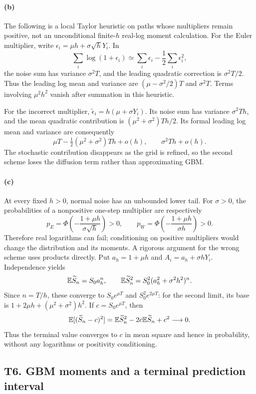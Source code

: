 \paragraph{(b)} The following is a local Taylor heuristic on paths whose multipliers remain positive, not an unconditional finite-$h$ real-log moment calculation. For the Euler multiplier, write $\epsilon_i=\mu h+\sigma\sqrt hY_i$. In
\[
 \sum_i\log(1+\epsilon_i)
 \simeq\sum_i\epsilon_i-\frac12\sum_i\epsilon_i^2,
\]
the noise sum has variance $\sigma^2T$, and the leading quadratic correction is $\sigma^2T/2$. Thus the leading log mean and variance are $(\mu-\sigma^2/2)T$ and $\sigma^2T$. Terms involving $\mu^2h^2$ vanish after summation in this heuristic.

For the incorrect multiplier, $\widetilde\epsilon_i=h(\mu+\sigma Y_i)$. Its noise sum has variance $\sigma^2Th$, and the mean quadratic contribution is $(\mu^2+\sigma^2)Th/2$. Its formal leading log mean and variance are consequently
\[
 \mu T-\tfrac12(\mu^2+\sigma^2)Th+o(h),\qquad
 \sigma^2Th+o(h).
\]
The stochastic contribution disappears as the grid is refined, so the second scheme loses the diffusion term rather than approximating GBM.
\paragraph{(c)} At every fixed $h>0$, normal noise has an unbounded lower tail. For $\sigma>0$, the probabilities of a nonpositive one-step multiplier are respectively
\[
 p_E=\Phi\!\left(-\frac{1+\mu h}{\sigma\sqrt h}\right)>0,
 \qquad
 p_W=\Phi\!\left(-\frac{1+\mu h}{\sigma h}\right)>0.
\]
Therefore real logarithms can fail; conditioning on positive multipliers would change the distribution and its moments. A rigorous argument for the wrong scheme uses products directly. Put $a_h=1+\mu h$ and $A_i=a_h+\sigma hY_i$. Independence yields
\[
 \mathbb E\widetilde S_n=S_0a_h^n,\qquad
 \mathbb E\widetilde S_n^2=S_0^2(a_h^2+\sigma^2h^2)^n.
\]
Since $n=T/h$, these converge to $S_0e^{\mu T}$ and $S_0^2e^{2\mu T}$: for the second limit, its base is $1+2\mu h+(\mu^2+\sigma^2)h^2$. If $c=S_0e^{\mu T}$, then
\[
 \mathbb E[(\widetilde S_n-c)^2]
 =\mathbb E\widetilde S_n^2-2c\mathbb E\widetilde S_n+c^2\longrightarrow0.
\]
Thus the terminal value converges to $c$ in mean square and hence in probability, without any logarithms or positivity conditioning.

\subsection{T6. GBM moments and a terminal prediction interval}
